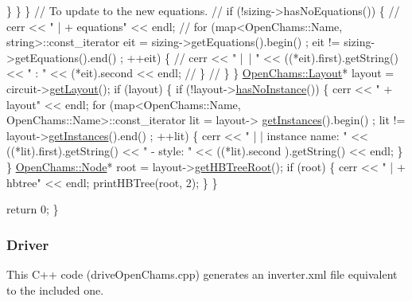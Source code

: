 \begin{DoxyCodeInclude}
                \}
            \}
        \}
        \textcolor{comment}{// To update to the new equations.}
        \textcolor{comment}{// if (!sizing->hasNoEquations()) \{}
        \textcolor{comment}{//     cerr << " | + equations" << endl;}
        \textcolor{comment}{//     for (map<OpenChams::Name, string>::const\_iterator eit = sizing->getEquations().begin() ; eit
       != sizing->getEquations().end() ; ++eit) \{}
        \textcolor{comment}{//         cerr << " | | " << ((*eit).first).getString() << " : " << (*eit).second << endl;}
        \textcolor{comment}{//     \}}
        \textcolor{comment}{// \}}
    \}
    \hyperlink{class_open_chams_1_1_layout}{OpenChams::Layout}* layout = circuit->\hyperlink{class_open_chams_1_1_circuit_a403a908943f9a3e820fd25a86d00531d}{getLayout}();
    \textcolor{keywordflow}{if} (layout) \{
       \textcolor{keywordflow}{if} (!layout->\hyperlink{class_open_chams_1_1_layout_af27a31f10fcf22daa64f35c9c6bd2cda}{hasNoInstance}()) \{
          cerr << \textcolor{stringliteral}{" + layout"} << endl;
          \textcolor{keywordflow}{for} (map<OpenChams::Name, OpenChams::Name>::const\_iterator lit = layout->
      \hyperlink{class_open_chams_1_1_layout_ab0550a9050b7e788b2a18452c9df21f7}{getInstances}().begin() ; lit != layout->\hyperlink{class_open_chams_1_1_layout_ab0550a9050b7e788b2a18452c9df21f7}{getInstances}().end() ; ++lit) \{
             cerr << \textcolor{stringliteral}{" | | instance name: "} << ((*lit).first).getString() << \textcolor{stringliteral}{" - style: "} << ((*lit).second
      ).getString() << endl;
          \}
       \}
       \hyperlink{class_open_chams_1_1_node}{OpenChams::Node}* root = layout->\hyperlink{class_open_chams_1_1_layout_a13df4992219ef28a7dc014e9f5f0566a}{getHBTreeRoot}();
       \textcolor{keywordflow}{if} (root) \{
           cerr << \textcolor{stringliteral}{" | + hbtree"} << endl;
           printHBTree(root, 2);
       \}
    \}


    \textcolor{keywordflow}{return} 0;
\}

\end{DoxyCodeInclude}
\hypertarget{openchams_openChamsDriveC}{}\subsubsection{Driver}\label{openchams_openChamsDriveC}
This C++ code ({\ttfamily drive\-Open\-Chams.\-cpp}) generates an inverter.\-xml file equivalent to the included one. 
